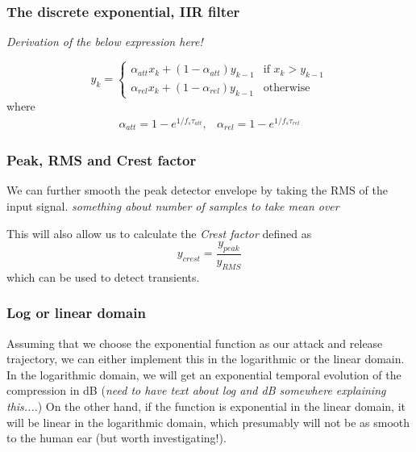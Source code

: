 \documentclass[]{article}
\begin{document}
\subsubsection{The discrete exponential, IIR filter}
\emph{Derivation of the below expression here!}

\begin{equation}
y_k = \left\{
  \begin{array}{ll}
    \alpha_{att} x_k + (1-\alpha_{att})y_{k-1} & \text{if }  x_k > y_{k-1} \\
    \alpha_{rel} x_k + (1-\alpha_{rel})y_{k-1} & \text{otherwise} 
  \end{array}
\right.
\end{equation}
where
\begin{equation}
\begin{array}{lr}
\alpha_{att} = 1-e^{1/f_s \tau_{att}}, & \alpha_{rel} = 1-e^{1/f_s \tau_{rel}}
\end{array}
\end{equation}

\subsubsection{Peak, RMS and Crest factor}
We can further smooth the peak detector envelope by taking the RMS of the input signal. \emph{something about number of samples to take mean over}

This will also allow us to calculate the \emph{Crest factor} defined as
\begin{equation}
y_{crest} = \frac{y_{peak}}{y_{RMS}}
\end{equation}
which can be used to detect transients.

\subsubsection{Log or linear domain}
Assuming that we choose the exponential function as our attack and release trajectory, we can either implement this in the logarithmic or the linear domain. In the logarithmic domain, we will get an exponential temporal evolution of the compression in dB (\emph{need to have text about log and dB somewhere explaining this...}.) On the other hand, if the function is exponential in the linear domain, it will be linear in the logarithmic domain, which presumably will not be as smooth to the human ear (but worth investigating!).
\end{document}

